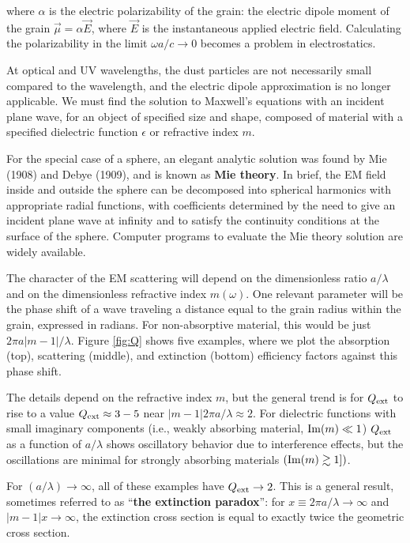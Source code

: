 \documentclass[a4paper,10pt]{article}
\begin{document}
{\noindent}where $\alpha$ is the electric polarizability of the grain: the electric dipole moment of the grain $\vec{\mu}=\alpha\vec{E}$, where $\vec{E}$ is the instantaneous applied electric field. Calculating the polarizability in the limit $\omega a/c\rightarrow0$ becomes a problem in electrostatics.

{\noindent}At optical and UV wavelengths, the dust particles are not necessarily small compared to the wavelength, and the electric dipole approximation is no longer applicable. We must find the solution to Maxwell's equations with an incident plane wave, for an object of specified size and shape, composed of material with a specified dielectric function $\epsilon$ or refractive index $m$.

{\noindent}For the special case of a sphere, an elegant analytic solution was found by Mie (1908) and Debye (1909), and is known as \textbf{Mie theory}. In brief, the EM field inside and outside the sphere can be decomposed into spherical harmonics with appropriate radial functions, with coefficients determined by the need to give an incident plane wave at infinity and to satisfy the continuity conditions at the surface of the sphere. Computer programs to evaluate the Mie theory solution are widely available.

{\noindent}The character of the EM scattering will depend on the dimensionless ratio $a/\lambda$ and on the dimensionless refractive index $m(\omega)$. One relevant parameter will be the phase shift of a wave traveling a distance equal to the grain radius within the grain, expressed in radians. For non-absorptive material, this would be just $2\pi a|m-1|/\lambda$. Figure \ref{fig:Q} shows five examples, where we plot the absorption (top), scattering (middle), and extinction (bottom) efficiency factors against this phase shift.

{\noindent}The details depend on the refractive index $m$, but the general trend is for $Q_{\rm ext}$ to rise to a value $Q_{\rm ext}\approx3-5$ near $|m-1|2\pi a/\lambda\approx2$. For dielectric functions with small imaginary components (i.e., weakly absorbing material, ${\rm Im}(m)\ll1$) $Q_{\rm ext}$ as a function of $a/\lambda$ shows oscillatory behavior due to interference effects, but the oscillations are minimal for strongly absorbing materials $({\rm Im}(m)\gtrsim1])$.

{\noindent}For $(a/\lambda)\rightarrow\infty$, all of these examples have $Q_{\rm ext}\rightarrow2$. This is a general result, sometimes referred to as ``\textbf{the extinction paradox}'': for $x\equiv2\pi a/\lambda\rightarrow\infty$ and $|m-1|x\rightarrow\infty$, the extinction cross section is equal to exactly twice the geometric cross section.
\end{document}
